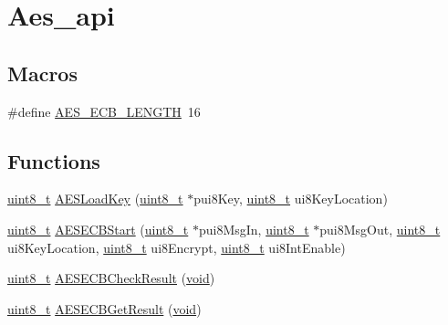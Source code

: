 \hypertarget{group__aes__api}{}\section{Aes\+\_\+api}
\label{group__aes__api}
\subsection*{Macros}
\begin{DoxyCompactItemize}
\item 
\#define \hyperlink{group__aes__api_ga878edd754ad357c28802e32e14de613c}{A\+E\+S\+\_\+\+E\+C\+B\+\_\+\+L\+E\+N\+G\+TH}~16
\end{DoxyCompactItemize}
\subsection*{Functions}
\begin{DoxyCompactItemize}
\item 
\hyperlink{_p_e___types_8h_aba7bc1797add20fe3efdf37ced1182c5}{uint8\+\_\+t} \hyperlink{group__aes__api_ga8cf4b93fc82426c96f1e08c588ee014d}{A\+E\+S\+Load\+Key} (\hyperlink{_p_e___types_8h_aba7bc1797add20fe3efdf37ced1182c5}{uint8\+\_\+t} $\ast$pui8\+Key, \hyperlink{_p_e___types_8h_aba7bc1797add20fe3efdf37ced1182c5}{uint8\+\_\+t} ui8\+Key\+Location)
\item 
\hyperlink{_p_e___types_8h_aba7bc1797add20fe3efdf37ced1182c5}{uint8\+\_\+t} \hyperlink{group__aes__api_ga6268f22e58344d09e2408f03f6d9c435}{A\+E\+S\+E\+C\+B\+Start} (\hyperlink{_p_e___types_8h_aba7bc1797add20fe3efdf37ced1182c5}{uint8\+\_\+t} $\ast$pui8\+Msg\+In, \hyperlink{_p_e___types_8h_aba7bc1797add20fe3efdf37ced1182c5}{uint8\+\_\+t} $\ast$pui8\+Msg\+Out, \hyperlink{_p_e___types_8h_aba7bc1797add20fe3efdf37ced1182c5}{uint8\+\_\+t} ui8\+Key\+Location, \hyperlink{_p_e___types_8h_aba7bc1797add20fe3efdf37ced1182c5}{uint8\+\_\+t} ui8\+Encrypt, \hyperlink{_p_e___types_8h_aba7bc1797add20fe3efdf37ced1182c5}{uint8\+\_\+t} ui8\+Int\+Enable)
\item 
\hyperlink{_p_e___types_8h_aba7bc1797add20fe3efdf37ced1182c5}{uint8\+\_\+t} \hyperlink{group__aes__api_ga114ba3eef65a9d0e20f163fe752bb032}{A\+E\+S\+E\+C\+B\+Check\+Result} (\hyperlink{usb__devapi_8h_afabf60e7f57651d6d595a02c75f07cd0}{void})
\item 
\hyperlink{_p_e___types_8h_aba7bc1797add20fe3efdf37ced1182c5}{uint8\+\_\+t} \hyperlink{group__aes__api_ga23bb052437e2b8e41a4e6478a2ad37b6}{A\+E\+S\+E\+C\+B\+Get\+Result} (\hyperlink{usb__devapi_8h_afabf60e7f57651d6d595a02c75f07cd0}{void})
\end{DoxyCompactItemize}
